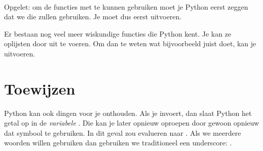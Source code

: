   \\[1em]
  Opgelet: om de functies met  te kunnen gebruiken moet je Python
  eerst zeggen dat we die zullen gebruiken. Je moet dus eerst 
  uitvoeren.

  Er bestaan nog veel meer wiskundige functies die Python kent. Je kan ze
  oplijsten door  uit te voeren. Om dan te weten wat bijvoorbeeld
   juist doet, kan je  uitvoeren.

\section{Toewijzen}
  Python kan ook dingen voor je onthouden. Als je  invoert,
  dan slaat Python het getal  op in de \emph{variabele} .
  Die kan je later opnieuw oproepen door gewoon opnieuw dat symbool te
  gebruiken. In dit geval zou  evalueren naar .
  Als we meerdere woorden willen gebruiken dan gebruiken we traditioneel een
  underscore: .

